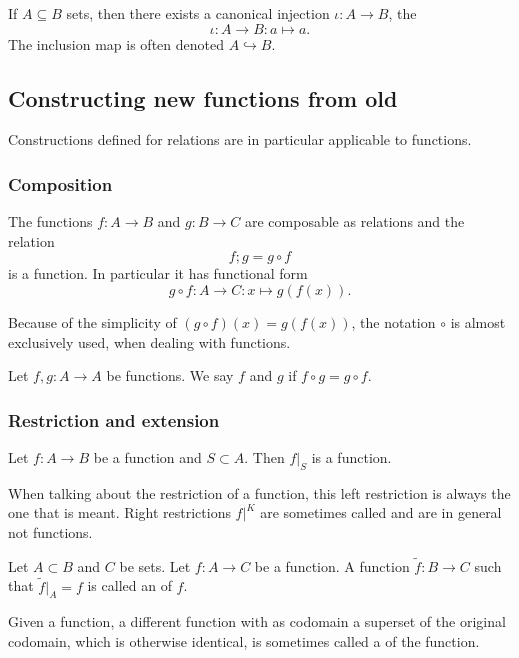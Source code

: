 \begin{lemma}
If $A\subseteq B$ sets, then there exists a canonical injection $\iota: A\to B$, the 
\[ \iota: A\to B: a\mapsto a. \]
The inclusion map is often denoted $A\hookrightarrow B$.
\end{lemma}

\subsection{Constructing new functions from old}
Constructions defined for relations are in particular applicable to functions.
\subsubsection{Composition}
\begin{lemma}
The functions $f:A\to B$ and $g:B\to C$ are composable as relations and the relation
\[ f;g = g\circ f \]
is a function. In particular it has functional form
\[ g\circ f: A\to C: x\mapsto g(f(x)). \]
\end{lemma}
Because of the simplicity of $(g\circ f)(x) = g(f(x))$, the notation $\circ$ is almost exclusively used, when dealing with functions.

\begin{definition}
Let $f, g:A\to A$ be functions. We say $f$ and $g$  if $f\circ g = g\circ f$.
\end{definition}

\subsubsection{Restriction and extension}
\begin{lemma}
Let $f: A\to B$ be a function and $S\subset A$. Then $f|_S$ is a function.
\end{lemma}
When talking about the restriction of a function, this left restriction is always the one that is meant. Right restrictions $f|^K$ are sometimes called  and are in general not functions.

\begin{definition}
Let $A\subset B$ and $C$ be sets. Let $f: A\to C$ be a function. A function $\tilde{f}: B\to C$ such that $\tilde{f}|_A = f$ is called an  of $f$.
\end{definition}
Given a function, a different function with as codomain a superset of the original codomain, which is otherwise identical, is sometimes called a  of the function.

